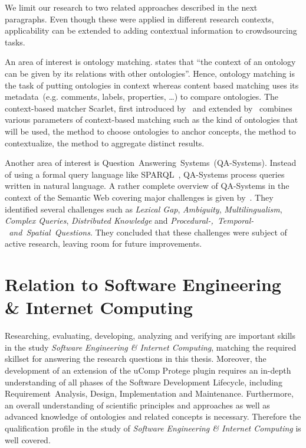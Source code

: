 \documentclass[12pt, notitlepage]{article}
\begin{document}
We limit our research to two related approaches described in the next paragraphs. Even though these were applied in different research contexts, applicability can be extended to adding contextual information to crowdsourcing tasks.

An area of interest is ontology matching. \citet{hoffmann2010context} states that \enquote{the context of an ontology can be given by its relations with other ontologies}. Hence, ontology matching is the task of putting ontologies in context whereas content based matching uses its metadata~(e.g. comments, labels, properties, \ldots) to compare ontologies. The context-based matcher Scarlet, first introduced by~\citet{sabou2008scarlet} and extended by~\citet{hoffmann2010context} combines various parameters of context-based matching such as the kind of ontologies that will be used, the method to choose ontologies to anchor concepts, the method to contextualize, the method to aggregate distinct results. 

Another area of interest is Question~Answering~Systems~(QA-Systems). Instead of using a formal query language like SPARQL~\cite{harris2013sparql}, QA-Systems process queries written in natural language. A rather complete overview of QA-Systems in the context of the Semantic Web covering major challenges is given by~\citet{hoffner2016survey}. They identified several challenges such as \emph{Lexical Gap}, \emph{Ambiguity}, \emph{Multilingualism}, \emph{Complex Queries}, \emph{Distributed Knowledge} and \emph{Procedural-,~Temporal-~and~Spatial~Questions}. They concluded that these challenges were subject of active research, leaving room for future improvements. 

\section{Relation to Software Engineering \& Internet Computing}
Researching, evaluating, developing, analyzing and verifying are important skills in the study \emph{Software Engineering \& Internet Computing}, matching the required skillset for answering the research questions in this thesis. Moreover, the development of an extension of the uComp Protege plugin requires an in-depth understanding of all phases of the Software Development Lifecycle, including Requirement~Analysis, Design, Implementation and Maintenance. Furthermore, an overall understanding of scientific principles and approaches as well as advanced knowledge of ontologies and related concepts is necessary. Therefore the qualification profile in the study of \emph{Software Engineering \& Internet Computing} is well covered. 
\end{document}

